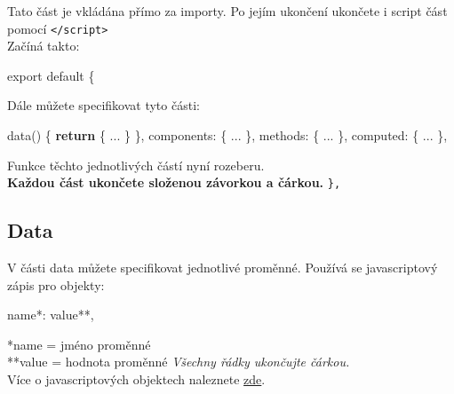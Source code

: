 \documentclass[
]{article}
\newenvironment{Shaded}{}{}
\newcommand{\AttributeTok}[1]{\textcolor[rgb]{0.49,0.56,0.16}{#1}}
\newcommand{\ControlFlowTok}[1]{\textcolor[rgb]{0.00,0.44,0.13}{\textbf{#1}}}
\newcommand{\ImportTok}[1]{#1}
\newcommand{\NormalTok}[1]{#1}
\newcommand{\OperatorTok}[1]{\textcolor[rgb]{0.40,0.40,0.40}{#1}}
\begin{document}
Tato část je vkládána přímo za importy. Po jejím ukončení ukončete i
script část pomocí \texttt{\textless{}/script\textgreater{}}\\

Začíná takto:

\begin{Shaded}
\begin{Highlighting}[]
    \ImportTok{export} \ImportTok{default} \OperatorTok{\{}
\end{Highlighting}
\end{Shaded}

Dále můžete specifikovat tyto části:

\begin{Shaded}
\begin{Highlighting}[]
    \AttributeTok{data}\NormalTok{() }\OperatorTok{\{}
        \ControlFlowTok{return} \OperatorTok{\{}
\NormalTok{            ...}
        \OperatorTok{\}}
    \OperatorTok{\},}
\NormalTok{    components}\OperatorTok{:} \OperatorTok{\{}
\NormalTok{        ...}
    \OperatorTok{\},}
\NormalTok{    methods}\OperatorTok{:} \OperatorTok{\{}
\NormalTok{        ...}
    \OperatorTok{\},}
\NormalTok{    computed}\OperatorTok{:} \OperatorTok{\{}
\NormalTok{        ...}
    \OperatorTok{\},}  
\end{Highlighting}
\end{Shaded}

Funkce těchto jednotlivých částí nyní rozeberu.\\

\textbf{Každou část ukončete složenou závorkou a čárkou.} \texttt{\},}

\hypertarget{data}{%
\subsection{Data}\label{data}}

V části data můžete specifikovat jednotlivé proměnné. Používá se
javascriptový zápis pro objekty:

\begin{Shaded}
\begin{Highlighting}[]
\NormalTok{name}\OperatorTok{*:}\NormalTok{ value}\OperatorTok{**,}
\end{Highlighting}
\end{Shaded}

*name = jméno proměnné\\
**value = hodnota proměnné \emph{Všechny řádky ukončujte čárkou.}\\
Více o javascriptových objektech naleznete
\href{https://www.w3schools.com/js/js_objects.asp}{zde}.
\end{document}
